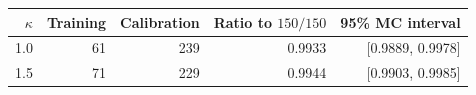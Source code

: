 \begin{tabular}{rrrrr}
\toprule
$\kappa$ & Training & Calibration & Ratio to $150/150$ & 95\% MC interval \\
\midrule
1.0 & 61 & 239 & 0.9933 & [0.9889, 0.9978] \\
1.5 & 71 & 229 & 0.9944 & [0.9903, 0.9985] \\
\bottomrule
\end{tabular}
